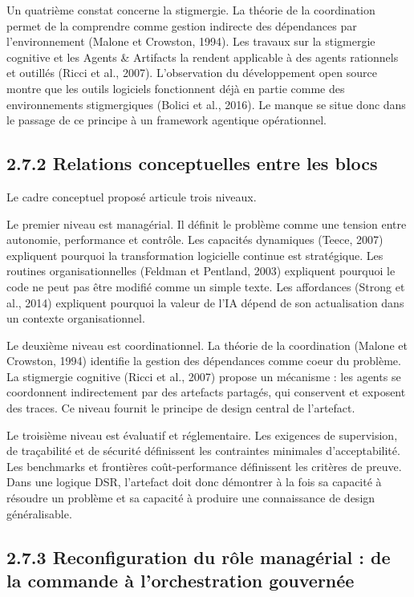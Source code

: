 Un quatrième constat concerne la stigmergie. La théorie de la coordination permet de la comprendre comme gestion indirecte des dépendances par l'environnement (Malone et Crowston, 1994). Les travaux sur la stigmergie cognitive et les Agents \& Artifacts la rendent applicable à des agents rationnels et outillés (Ricci et al., 2007). L'observation du développement open source montre que les outils logiciels fonctionnent déjà en partie comme des environnements stigmergiques (Bolici et al., 2016). Le manque se situe donc dans le passage de ce principe à un framework agentique opérationnel.

\subsection{2.7.2 Relations conceptuelles entre les blocs}\label{relations-conceptuelles-entre-les-blocs}

Le cadre conceptuel proposé articule trois niveaux.

Le premier niveau est managérial. Il définit le problème comme une tension entre autonomie, performance et contrôle. Les capacités dynamiques (Teece, 2007) expliquent pourquoi la transformation logicielle continue est stratégique. Les routines organisationnelles (Feldman et Pentland, 2003) expliquent pourquoi le code ne peut pas être modifié comme un simple texte. Les affordances (Strong et al., 2014) expliquent pourquoi la valeur de l'IA dépend de son actualisation dans un contexte organisationnel.

Le deuxième niveau est coordinationnel. La théorie de la coordination (Malone et Crowston, 1994) identifie la gestion des dépendances comme coeur du problème. La stigmergie cognitive (Ricci et al., 2007) propose un mécanisme : les agents se coordonnent indirectement par des artefacts partagés, qui conservent et exposent des traces. Ce niveau fournit le principe de design central de l'artefact.

Le troisième niveau est évaluatif et réglementaire. Les exigences de supervision, de traçabilité et de sécurité définissent les contraintes minimales d'acceptabilité. Les benchmarks et frontières coût-performance définissent les critères de preuve. Dans une logique DSR, l'artefact doit donc démontrer à la fois sa capacité à résoudre un problème et sa capacité à produire une connaissance de design généralisable.

\subsection{2.7.3 Reconfiguration du rôle managérial : de la commande à l'orchestration gouvernée}\label{reconfiguration-du-ruxf4le-managuxe9rial-de-la-commande-uxe0-lorchestration-gouvernuxe9e}

